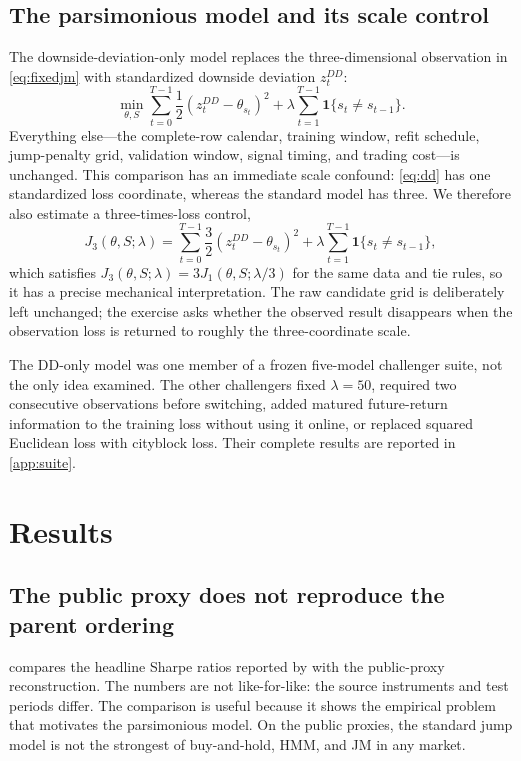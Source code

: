 \documentclass[11pt]{article}
\newcommand{\ind}{\mathbf{1}}
\begin{document}
\subsection{The parsimonious model and its scale control}

The downside-deviation-only model replaces the three-dimensional observation in
\cref{eq:fixedjm} with standardized downside deviation $z_t^{DD}$:
\begin{equation}
\min_{\theta,S}\sum_{t=0}^{T-1}\frac{1}{2}(z_t^{DD}-\theta_{s_t})^2
+\lambda\sum_{t=1}^{T-1}\ind\{s_t\neq s_{t-1}\}.
\label{eq:dd}
\end{equation}
Everything else---the complete-row calendar, training window, refit schedule,
jump-penalty grid, validation window, signal timing, and trading cost---is
unchanged. This comparison has an immediate scale confound: \cref{eq:dd} has one
standardized loss coordinate, whereas the standard model has three. We therefore
also estimate a three-times-loss control,
\begin{equation}
J_3(\theta,S;\lambda)=\sum_{t=0}^{T-1}\frac{3}{2}(z_t^{DD}-\theta_{s_t})^2
+\lambda\sum_{t=1}^{T-1}\ind\{s_t\neq s_{t-1}\},
\end{equation}
which satisfies $J_3(\theta,S;\lambda)=3J_1(\theta,S;\lambda/3)$ for the same
data and tie rules, so it has a precise mechanical interpretation. The raw
candidate grid is deliberately left unchanged; the exercise asks whether the
observed result disappears when the observation loss is returned to roughly the
three-coordinate scale.

The DD-only model was one member of a frozen five-model challenger suite, not the
only idea examined. The other challengers fixed $\lambda=50$, required two
consecutive observations before switching, added matured future-return
information to the training loss without using it online, or replaced squared
Euclidean loss with cityblock loss. Their complete results are reported in
\cref{app:suite}.

\section{Results}

\subsection{The public proxy does not reproduce the parent ordering}

 compares the headline Sharpe ratios reported by
\citet{shu2024} with the public-proxy reconstruction. The numbers are not
like-for-like: the source instruments and test periods differ. The comparison is
useful because it shows the empirical problem that motivates the parsimonious
model. On the public proxies, the standard jump model is not the strongest of
buy-and-hold, HMM, and JM in any market.
\end{document}
